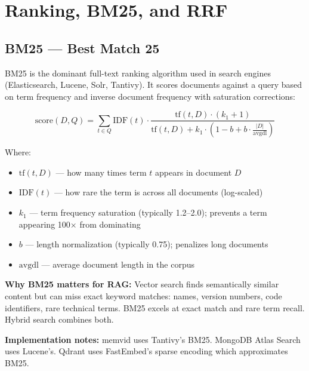 \chapter{Ranking, BM25, and RRF}
\label{ch:ranking}

\section{BM25 --- Best Match 25}

BM25 is the dominant full-text ranking algorithm used in search engines (Elasticsearch,
Lucene, Solr, Tantivy). It scores documents against a query based on term frequency and
inverse document frequency with saturation corrections:

\[
\text{score}(D, Q) = \sum_{t \in Q} \text{IDF}(t) \cdot \frac{\text{tf}(t,D) \cdot (k_1 + 1)}
  {\text{tf}(t,D) + k_1 \cdot \left(1 - b + b \cdot \frac{|D|}{\text{avgdl}}\right)}
\]

Where:

\begin{itemize}
    \item $\text{tf}(t, D)$ --- how many times term $t$ appears in document $D$
    \item $\text{IDF}(t)$ --- how rare the term is across all documents (log-scaled)
    \item $k_1$ --- term frequency saturation (typically 1.2--2.0); prevents a term appearing
          100$\times$ from dominating
    \item $b$ --- length normalization (typically 0.75); penalizes long documents
    \item $\text{avgdl}$ --- average document length in the corpus
\end{itemize}

\textbf{Why BM25 matters for RAG:} Vector search finds semantically similar content but can
miss exact keyword matches: names, version numbers, code identifiers, rare technical terms.
BM25 excels at exact match and rare term recall. Hybrid search combines both.

\textbf{Implementation notes:} memvid uses Tantivy's BM25. MongoDB Atlas Search uses Lucene's.
Qdrant uses FastEmbed's sparse encoding which approximates BM25.

